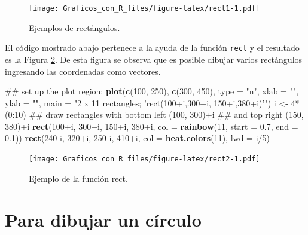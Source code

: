 \documentclass[10pt,]{krantz}
\makeatletter
\newenvironment{Shaded}{\begin{snugshade}}{\end{snugshade}}
\newcommand{\KeywordTok}[1]{\textcolor[rgb]{0.13,0.29,0.53}{\textbf{{#1}}}}
\newcommand{\DataTypeTok}[1]{\textcolor[rgb]{0.13,0.29,0.53}{{#1}}}
\newcommand{\DecValTok}[1]{\textcolor[rgb]{0.00,0.00,0.81}{{#1}}}
\newcommand{\FloatTok}[1]{\textcolor[rgb]{0.00,0.00,0.81}{{#1}}}
\newcommand{\StringTok}[1]{\textcolor[rgb]{0.31,0.60,0.02}{{#1}}}
\newcommand{\NormalTok}[1]{{#1}}
\newenvironment{kframe}{%
\medskip{}
\setlength{\fboxsep}{.8em}
 \def\at@end@of@kframe{}%
 \ifinner\ifhmode%
  \def\at@end@of@kframe{\end{minipage}}%
  \begin{minipage}{\columnwidth}%
 \fi\fi%
 \def\FrameCommand##1{\hskip\@totalleftmargin \hskip-\fboxsep
 \colorbox{shadecolor}{##1}\hskip-\fboxsep
     \hskip-\linewidth \hskip-\@totalleftmargin \hskip\columnwidth}%
 \MakeFramed {\advance\hsize-\width
   \@totalleftmargin\z@ \linewidth\hsize
   \@setminipage}}%
 {\par\unskip\endMakeFramed%
 \at@end@of@kframe}
\renewenvironment{Shaded}{\begin{kframe}}{\end{kframe}}
\makeatother
\begin{document}
\begin{figure}[htbp]
\centering
\texttt{[image: Graficos\_con\_R\_files/figure-latex/rect1-1.pdf]}
\caption{\label{fig:rect1}Ejemplos de rectángulos.}
\end{figure}

El código mostrado abajo pertenece a la ayuda de la función
\texttt{rect} y el resultado es la Figura \ref{fig:rect2}. De esta
figura se observa que es posible dibujar varios rectángulos ingresando
las coordenadas como vectores.

\begin{Shaded}
\begin{Highlighting}[]
\NormalTok{## set up the plot region:}
\KeywordTok{plot}\NormalTok{(}\KeywordTok{c}\NormalTok{(}\DecValTok{100}\NormalTok{, }\DecValTok{250}\NormalTok{), }\KeywordTok{c}\NormalTok{(}\DecValTok{300}\NormalTok{, }\DecValTok{450}\NormalTok{), }\DataTypeTok{type =} \StringTok{"n"}\NormalTok{, }\DataTypeTok{xlab =} \StringTok{""}\NormalTok{, }\DataTypeTok{ylab =} \StringTok{""}\NormalTok{,}
     \DataTypeTok{main =} \StringTok{"2 x 11 rectangles; 'rect(100+i,300+i,  150+i,380+i)'"}\NormalTok{)}
\NormalTok{i <-}\StringTok{ }\DecValTok{4}\NormalTok{*(}\DecValTok{0}\NormalTok{:}\DecValTok{10}\NormalTok{)}
\NormalTok{## draw rectangles with bottom left (100, 300)+i}
\NormalTok{## and top right (150, 380)+i}
\KeywordTok{rect}\NormalTok{(}\DecValTok{100}\NormalTok{+i, }\DecValTok{300}\NormalTok{+i, }\DecValTok{150}\NormalTok{+i, }\DecValTok{380}\NormalTok{+i, }\DataTypeTok{col =} \KeywordTok{rainbow}\NormalTok{(}\DecValTok{11}\NormalTok{, }\DataTypeTok{start =} \FloatTok{0.7}\NormalTok{, }\DataTypeTok{end =} \FloatTok{0.1}\NormalTok{))}
\KeywordTok{rect}\NormalTok{(}\DecValTok{240}\NormalTok{-i, }\DecValTok{320}\NormalTok{+i, }\DecValTok{250}\NormalTok{-i, }\DecValTok{410}\NormalTok{+i, }\DataTypeTok{col =} \KeywordTok{heat.colors}\NormalTok{(}\DecValTok{11}\NormalTok{), }\DataTypeTok{lwd =} \NormalTok{i/}\DecValTok{5}\NormalTok{)}
\end{Highlighting}
\end{Shaded}

\begin{figure}[htbp]
\centering
\texttt{[image: Graficos\_con\_R\_files/figure-latex/rect2-1.pdf]}
\caption{\label{fig:rect2}Ejemplo de la función rect.}
\end{figure}

\section{\texorpdfstring{Para dibujar un círculo
}{Para dibujar un círculo }}\label{para-dibujar-un-circulo}
\end{document}
